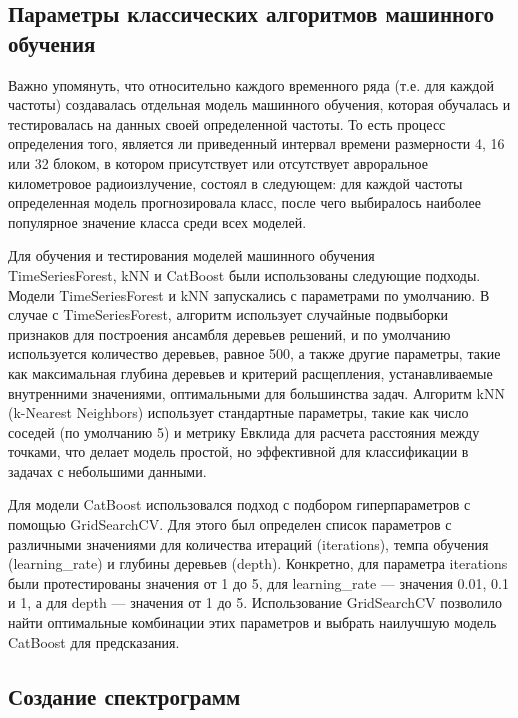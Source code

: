 \documentclass[spec, och, diploma]{SCWorks}
\begin{document}
    \subsection{Параметры классических алгоритмов машинного обучения}

        Важно упомянуть, что относительно каждого временного ряда (т.е. для
        каждой частоты) создавалась отдельная модель машинного обучения, которая
        обучалась и тестировалась на данных своей определенной частоты. То есть
        процесс определения того, является ли приведенный интервал времени
        размерности 4, 16 или 32 блоком, в котором присутствует или отсутствует
        авроральное километровое радиоизлучение, состоял в следующем: для каждой
        частоты определенная модель прогнозировала класс, после чего выбиралось
        наиболее популярное значение класса среди всех моделей.
        
        Для обучения и тестирования моделей машинного обучения\\
        TimeSeriesForest, kNN и CatBoost были использованы следующие подходы.
        Модели TimeSeriesForest и kNN запускались с параметрами по умолчанию. В
        случае с TimeSeriesForest, алгоритм использует случайные подвыборки
        признаков для построения ансамбля деревьев решений, и по умолчанию
        используется количество деревьев, равное 500, а также другие параметры,
        такие как максимальная глубина деревьев и критерий расщепления,
        устанавливаемые внутренними значениями, оптимальными для большинства
        задач. Алгоритм kNN (k-Nearest Neighbors) использует стандартные
        параметры, такие как число соседей (по умолчанию 5) и метрику Евклида
        для расчета расстояния между точками, что делает модель простой, но
        эффективной для классификации в задачах с небольшими данными.

        Для модели CatBoost использовался подход с подбором гиперпараметров с
        помощью GridSearchCV. Для этого был определен список параметров с
        различными значениями для количества итераций (iterations), темпа
        обучения (learning_rate) и глубины деревьев (depth). Конкретно, для
        параметра iterations были протестированы значения от 1 до 5, для
        learning_rate — значения 0.01, 0.1 и 1, а для depth — значения от 1 до
        5. Использование GridSearchCV позволило найти оптимальные комбинации
        этих параметров и выбрать наилучшую модель CatBoost для предсказания.

    \subsection{Создание спектрограмм}    
\end{document}
